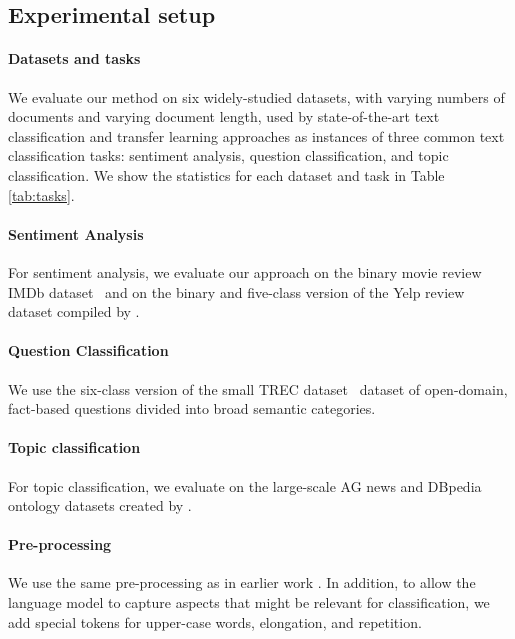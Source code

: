 \documentclass[11pt,a4paper]{article}
\begin{document}
\subsection{Experimental setup}

\paragraph{Datasets and tasks} We evaluate our method on six widely-studied datasets, with varying numbers of documents and varying document length, used by state-of-the-art text classification and transfer learning approaches \cite{johnson2017deep,Mccann2017} as instances of three common text classification tasks: sentiment analysis, question classification, and topic classification. We show the statistics for each dataset and task in Table \ref{tab:tasks}.

\paragraph{Sentiment Analysis} For sentiment analysis, we evaluate our approach on the binary movie review IMDb dataset~\cite{maas2011learning} and on the binary and five-class version of the Yelp review dataset compiled by .

\paragraph{Question Classification} We use the six-class version of the small TREC dataset~\cite{voorhees1999trec} dataset of open-domain, fact-based questions divided into broad semantic categories.

\paragraph{Topic classification} For topic classification, we evaluate on the large-scale AG news and DBpedia ontology datasets created by .

\paragraph{Pre-processing} We use the same pre-processing as in earlier work \cite{johnson2017deep,Mccann2017}. In addition, to allow the language model to capture aspects that might be relevant for classification, we add special tokens for upper-case words, elongation, and repetition.
\end{document}
